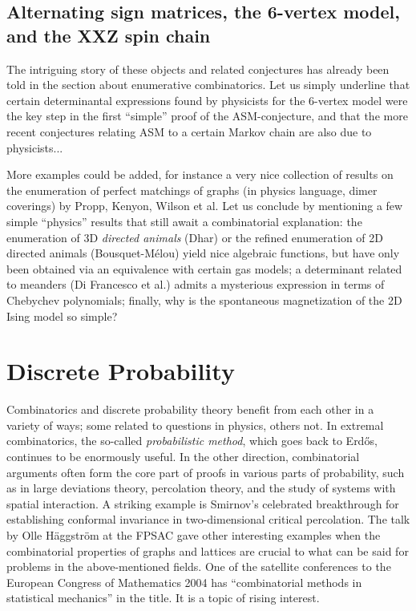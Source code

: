 \documentclass{amsart}
\begin{document}
\subsection{Alternating sign matrices, the 6-vertex model, and the XXZ
  spin chain}
The intriguing story of these objects and related conjectures has
already been told in the section about enumerative combinatorics. Let
us simply underline that certain determinantal expressions found by
physicists for the 6-vertex model were the key step in the first
``simple'' proof of the ASM-conjecture, and that the more recent
conjectures relating ASM to a certain Markov chain are also due to
physicists...

More examples could be added, for instance a very nice collection of
results on the enumeration of perfect matchings of graphs (in
physics language, dimer coverings) by Propp, Kenyon, Wilson et al. Let us
 conclude by mentioning a few simple ``physics'' results that still
await a combinatorial explanation: the enumeration of 3D {\em directed
  animals\/} (Dhar) or the refined enumeration of 2D directed animals
(Bousquet-M\'elou) yield nice algebraic functions, but have only been
obtained via an equivalence with certain gas models; a determinant
related to meanders (Di Francesco et al.) admits a mysterious
expression in
terms of Chebychev polynomials; finally, why is the spontaneous
magnetization of the 2D Ising model so simple?


\section{Discrete Probability}

Combinatorics and discrete probability theory benefit from each other in a
variety of ways; some related to questions in physics,
others not. In extremal combinatorics, the so-called {\em
probabilistic method}, which goes back to Erd\H{o}s, continues to be
enormously useful.
In the other direction, combinatorial arguments often form the core part of
proofs in various parts of probability, such as in large deviations theory,
percolation theory, and the study of systems with spatial interaction. A
striking example is Smirnov's celebrated breakthrough for establishing
conformal invariance in two-dimensional critical percolation. The talk by
Olle H\"aggstr\"om at the FPSAC gave other interesting examples when the
combinatorial properties of graphs and lattices are crucial to what can be
said for problems in the above-mentioned fields.  One of the satellite
conferences to the European Congress of Mathematics 2004 has ``combinatorial
methods in statistical mechanics'' in the title. It is a topic of rising
interest.
\end{document}
